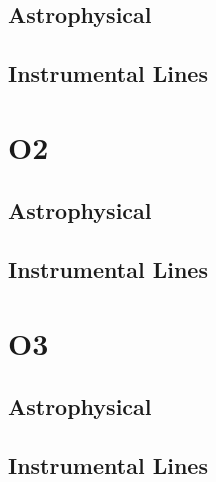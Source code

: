 \subsection{Astrophysical}

\subsection{Instrumental Lines}

\section{O2}

\subsection{Astrophysical}

\subsection{Instrumental Lines}

\section{O3}

\subsection{Astrophysical}

\subsection{Instrumental Lines}
